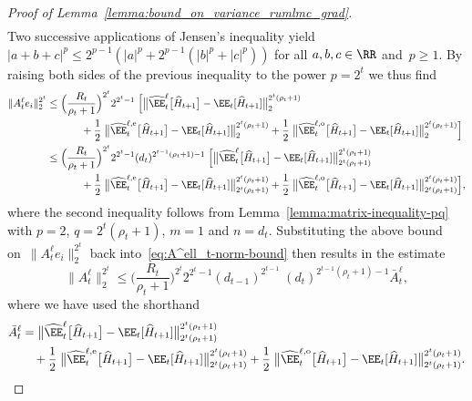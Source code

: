 \documentclass[11pt]{article}
\let\hat\widehat
\begin{document}
\begin{proof}[Proof of Lemma~\ref{lemma:bound_on_variance_rumlmc_grad}]
\begin{align*}
\end{align*}
Two successive applications of Jensen's inequality yield $|a+b+c|^p \le 2^{p-1}(|a|^p+2^{p-1}(|b|^p+|c|^p))$ for all $a,b,c\in\RR$ and~$p\geq 1$. By raising both sides of the previous inequality to the power $p=2^t$ we thus find
\begin{align*}
    \|A_t^\ell e_i\|_{2}^{2^t}
    & \leq \Big(\frac{R_t}{\rho_t+1}\Big)^{2^t}2^{2^t-1} \; \Big[
    \big\|\hat\EE_t^{\ell}\big[\hat{H}_{t+1}\big] - \EE_t[\hat{H}_{t+1}]\big\|_2^{2^t(\rho_t+1)} \\
    &\qquad\;\quad + \frac{1}{2} \; \big\|\hat\EE_t^{\ell, {\rm e}}\big[\hat{H}_{t+1}\big] - \EE_t[\hat{H}_{t+1}]\big\|_2^{2^t(\rho_t+1)} + \frac{1}{2} \; \big\|\hat\EE_t^{\ell, {\rm o}}\big[\hat{H}_{t+1}\big] - \EE_t[\hat{H}_{t+1}]\big\|_2^{2^t(\rho_t+1)} \Big]\\
    & \leq \Big(\frac{R_t}{\rho_t+1}\Big)^{2^t} 2^{2^t-1} (d_t)^{2^{t-1}(\rho_t+1)-1} \; \Big[
    \big\|\hat\EE_t^{\ell}\big[\hat{H}_{t+1}\big] - \EE_t[\hat{H}_{t+1}]\big\|_{2^t(\rho_t+1)}^{2^t(\rho_t+1)} \\
    &\qquad\;\quad + \frac{1}{2} \; \big\|\hat\EE_t^{\ell, {\rm e}}\big[\hat{H}_{t+1}\big] - \EE_t[\hat{H}_{t+1}]\big\|_{2^t(\rho_t+1)}^{2^t(\rho_t+1)} + \frac{1}{2} \; \big\|\hat\EE_t^{\ell, {\rm o}}\big[\hat{H}_{t+1}\big] - \EE_t[\hat{H}_{t+1}]\big\|_{2^t(\rho_t+1)}^{2^t(\rho_t+1)} \Big],
\end{align*}
where the second inequality follows from Lemma~\ref{lemma:matrix-inequality-pq} with $p=2$, $q=2^{t}(\rho_t+1)$, $m=1$ and $n=d_t$. Substituting the above bound on~$\|A_t^\ell e_i\|_{2}^{2^t}$ back into~\eqref{eq:A^ell_t-norm-bound} then results in the estimate
\begin{equation}
    \label{eq:A_ell_t_bound}
    \| A^\ell_t\|_{2}^{2^t} \leq \Big(\frac{R_t}{\rho_t+1}\Big)^{2^t} 2^{2^t-1} (d_{t-1})^{2^{t-1}}\; (d_t)^{2^{t-1}(\rho_t+1)-1} \bar{A}_t^\ell,
\end{equation}
where we have used the shorthand 
\begin{align*}
    \bar{A}_t^\ell & = \big\|\hat\EE_t^{\ell}\big[\hat{H}_{t+1}\big] - \EE_t[\hat{H}_{t+1}]\big\|_{2^t(\rho_t+1)}^{2^t(\rho_t+1)} \\
    &\quad + \frac{1}{2} \; \big\|\hat\EE_t^{\ell, {\rm e}}\big[\hat{H}_{t+1}\big] - \EE_t[\hat{H}_{t+1}]\big\|_{2^t(\rho_t+1)}^{2^t(\rho_t+1)} + \frac{1}{2} \; \big\|\hat\EE_t^{\ell, {\rm o}}\big[\hat{H}_{t+1}\big] - \EE_t[\hat{H}_{t+1}]\big\|_{2^t(\rho_t+1)}^{2^t(\rho_t+1)}.
\end{align*}

\end{proof}
\end{document}
